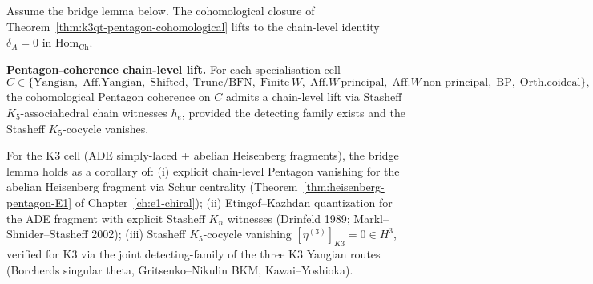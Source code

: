 \begin{theorem}
\label{thm:k3qt-pentagon-chain-level}
Assume the bridge lemma below. The cohomological closure of
Theorem~\ref{thm:k3qt-pentagon-cohomological} lifts to the chain-level
identity $\delta_A = 0$ in $\mathrm{Hom}_{\mathrm{Ch}}$.

\medskip
\textbf{Pentagon-coherence chain-level lift.}
For each specialisation cell
\[
C \in \{\mathrm{Yangian},\;
\mathrm{Aff.Yangian},\; \mathrm{Shifted},\; \mathrm{Trunc/BFN},\;
\mathrm{Finite}\, W,\; \mathrm{Aff}.W\,\mathrm{principal},\;
\mathrm{Aff}.W\,\mathrm{non}\text{-}\mathrm{principal},\; \mathrm{BP},\;
\mathrm{Orth.coideal}\},
\]
the cohomological Pentagon coherence on
$C$ admits a chain-level lift via Stasheff $K_5$-associahedral chain
witnesses $h_e$, provided the detecting family exists and the
Stasheff $K_5$-cocycle vanishes.
\medskip

For the K$3$ cell (ADE simply-laced + abelian Heisenberg fragments),
the bridge lemma holds as a corollary of:
(i) explicit chain-level Pentagon vanishing for the abelian
Heisenberg fragment via Schur centrality
\textup{(}Theorem~\ref{thm:heisenberg-pentagon-E1} of
Chapter~\ref{ch:e1-chiral}\textup{);}
(ii) Etingof--Kazhdan quantization for the ADE fragment with explicit
Stasheff $K_n$ witnesses
\textup{(}Drinfeld 1989; Markl--Shnider--Stasheff 2002\textup{);}
(iii) Stasheff $K_5$-cocycle vanishing
$[\eta^{(3)}]_{K3} = 0 \in H^3$, verified for K$3$ via the joint
detecting-family of the three K$3$ Yangian routes
(Borcherds singular theta, Gritsenko--Nikulin BKM, Kawai--Yoshioka).
\end{theorem}

